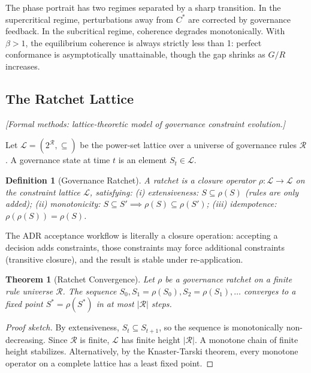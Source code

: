 \documentclass[11pt, a4paper, logo, copyright]{googledeepmind}
\newtheorem{definition}{Definition}[section]
\newtheorem{theorem}{Theorem}[section]
\begin{document}
The phase portrait has two regimes separated by a sharp transition. In the supercritical regime, perturbations away from $C^*$ are corrected by governance feedback. In the subcritical regime, coherence degrades monotonically. With $\beta > 1$, the equilibrium coherence is always strictly less than 1: perfect conformance is asymptotically unattainable, though the gap shrinks as $G/R$ increases.

\subsection{The Ratchet Lattice}
\emph{[Formal methods: lattice-theoretic model of governance constraint evolution.]}

Let $\mathcal{L} = (2^{\mathcal{R}}, \subseteq)$ be the power-set lattice over a universe of governance rules $\mathcal{R}$. A governance state at time $t$ is an element $S_t \in \mathcal{L}$.

\begin{definition}[Governance Ratchet]
\label{def:ratchet}
A ratchet is a closure operator $\rho: \mathcal{L} \to \mathcal{L}$ on the constraint lattice $\mathcal{L}$, satisfying: (i) extensiveness: $S \subseteq \rho(S)$ (rules are only added); (ii) monotonicity: $S \subseteq S' \implies \rho(S) \subseteq \rho(S')$; (iii) idempotence: $\rho(\rho(S)) = \rho(S)$.
\end{definition}

The ADR acceptance workflow is literally a closure operation: accepting a decision adds constraints, those constraints may force additional constraints (transitive closure), and the result is stable under re-application.

\begin{theorem}[Ratchet Convergence]
\label{thm:ratchet-convergence}
Let $\rho$ be a governance ratchet on a finite rule universe $\mathcal{R}$. The sequence $S_0, S_1 = \rho(S_0), S_2 = \rho(S_1), \ldots$ converges to a fixed point $S^* = \rho(S^*)$ in at most $|\mathcal{R}|$ steps.
\end{theorem}

\begin{proof}[Proof sketch]
By extensiveness, $S_t \subseteq S_{t+1}$, so the sequence is monotonically non-decreasing. Since $\mathcal{R}$ is finite, $\mathcal{L}$ has finite height $|\mathcal{R}|$. A monotone chain of finite height stabilizes. Alternatively, by the Knaster-Tarski theorem, every monotone operator on a complete lattice has a least fixed point.
\end{proof}
\end{document}
